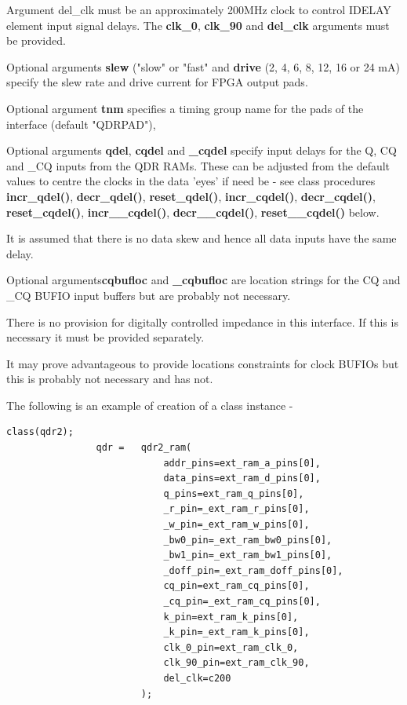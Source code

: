             Argument del\_clk must be an approximately 200MHz clock to
            control IDELAY element input signal delays. The {\bf clk\_0},
            {\bf clk\_90} and {\bf del\_clk} arguments must be provided.
            
            Optional arguments {\bf slew} ("slow" or "fast" and {\bf drive}
            (2, 4, 6, 8, 12, 16 or 24 mA) specify the slew rate and drive
            current for FPGA output pads.
            
            Optional argument {\bf tnm} specifies a timing group name for
            the pads of the interface (default "QDRPAD"),
            
            Optional arguments {\bf qdel}, {\bf cqdel} and {\bf \_cqdel}
            specify input delays for the Q, CQ and \_CQ inputs from the QDR
            RAMs. These can be adjusted from the default values to centre
            the clocks in the data 'eyes' if need be - see class procedures
            {\bf incr\_qdel()}, {\bf decr\_qdel()}, {\bf reset\_qdel()},
            {\bf incr\_cqdel()}, {\bf decr\_cqdel()}, {\bf reset\_cqdel()},
            {\bf incr\_\_cqdel()}, {\bf decr\_\_cqdel()}, {\bf
            reset\_\_cqdel()} below.
            
            It is assumed that there is no data skew and hence all data
            inputs have the same delay.
            
            Optional arguments{\bf cqbufloc} and {\bf \_cqbufloc} are location
            strings for the CQ and \_CQ BUFIO input buffers but are probably
            not necessary.
            
            There is no provision for digitally controlled impedance in this
            interface. If this is necessary it must be provided separately.
                        
            It may prove advantageous to provide locations constraints for
            clock BUFIOs but this is probably not necessary and has not.
 
            The following is an example of creation of a class instance - 
 
            \begin{lstlisting}[gobble=12, language=threepl]
                class(qdr2);
                qdr =   qdr2_ram(
                            addr_pins=ext_ram_a_pins[0],
                            data_pins=ext_ram_d_pins[0],
                            q_pins=ext_ram_q_pins[0],
                            _r_pin=_ext_ram_r_pins[0],
                            _w_pin=_ext_ram_w_pins[0],
                            _bw0_pin=_ext_ram_bw0_pins[0],
                            _bw1_pin=_ext_ram_bw1_pins[0],
                            _doff_pin=_ext_ram_doff_pins[0],
                            cq_pin=ext_ram_cq_pins[0],
                            _cq_pin=_ext_ram_cq_pins[0],
                            k_pin=ext_ram_k_pins[0],
                            _k_pin=_ext_ram_k_pins[0],
                            clk_0_pin=ext_ram_clk_0,
                            clk_90_pin=ext_ram_clk_90,
                            del_clk=c200
                        );
            \end{lstlisting}



